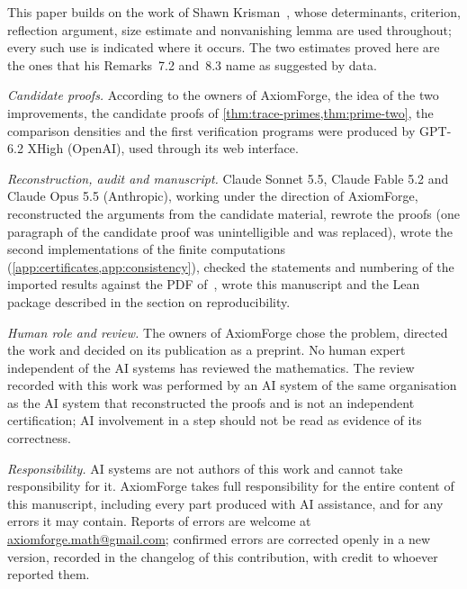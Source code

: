 
This paper builds on the work of Shawn Krisman~\cite{Krisman2026units}, whose determinants, criterion, reflection
argument, size estimate and nonvanishing lemma are used throughout; every such use is indicated where it occurs. The two
estimates proved here are the ones that his Remarks~7.2 and~8.3 name as suggested by data.


\emph{Candidate proofs.} According to the owners of AxiomForge, the idea of the two improvements, the candidate proofs of
\cref{thm:trace-primes,thm:prime-two}, the comparison densities and the first verification programs were produced by
GPT-6.2 XHigh (OpenAI), used through its web interface.

\emph{Reconstruction, audit and manuscript.} Claude Sonnet 5.5, Claude Fable 5.2 and Claude Opus 5.5 (Anthropic), working
under the direction of AxiomForge, reconstructed the arguments from the candidate material, rewrote the proofs (one
paragraph of the candidate proof was unintelligible and was replaced), wrote the second implementations of the finite
computations (\cref{app:certificates,app:consistency}), checked the statements and numbering of the imported results
against the PDF of~\Kri, wrote this manuscript and the Lean package described in the section on reproducibility.

\emph{Human role and review.} The owners of AxiomForge chose the problem, directed the work and decided on its
publication as a preprint. No human expert independent of the AI systems has reviewed the mathematics. The review
recorded with this work was performed by an AI system of the same organisation as the AI system that reconstructed the
proofs and is not an independent certification; AI involvement in a step should not be read as evidence of its
correctness.

\emph{Responsibility.} AI systems are not authors of this work and cannot take responsibility
for it. AxiomForge takes full responsibility for the entire content of this manuscript,
including every part produced with AI assistance, and for any errors it may contain. Reports
of errors are welcome at \href{mailto:axiomforge.math@gmail.com}{axiomforge.math@gmail.com};
confirmed errors are corrected openly in a new version, recorded in the changelog of this
contribution, with credit to whoever reported them.
